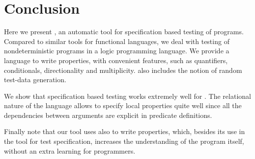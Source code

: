 
\section{Conclusion}
\label{sec:conclusion}



Here we present \plqc{}, an automatic tool for specification based
testing of \Prolog{} programs.
%
Compared to similar tools for functional languages, we deal with testing
of nondeterministic programs in a logic programming language.
%
We provide a language to write properties, with convenient features,
such as quantifiers, conditionals, directionality and multiplicity.
%
\plqc{} also includes the notion of random test-data generation.
%


We show that specification based testing works extremely well for
\Prolog.
%
The relational nature of the language allows to specify local properties
quite well since all the dependencies between arguments are explicit in
predicate definitions.


Finally note that our tool uses \Prolog{} also to write properties, which,
besides its use in the tool for test specification, increases the
understanding of the program itself, without an extra learning for
\Prolog{} programmers.
